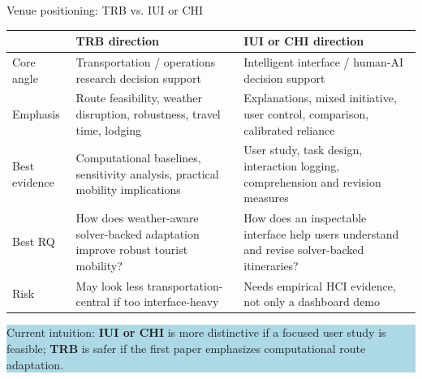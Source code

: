 \documentclass[aspectratio=169,10pt]{beamer}
\begin{document}
\begin{frame}{Venue positioning: TRB vs. IUI or CHI}
\renewcommand{\arraystretch}{1.22}
\scriptsize
\begin{tabular}{@{}>{\raggedright\arraybackslash}p{} >{\raggedright\arraybackslash}p{} >{\raggedright\arraybackslash}p{}@{}}
\toprule
 & \textbf{TRB direction} & \textbf{IUI or CHI direction} \\
\midrule
Core angle & Transportation / operations research decision support & Intelligent interface / human-AI decision support \\
Emphasis & Route feasibility, weather disruption, robustness, travel time, lodging & Explanations, mixed initiative, user control, comparison, calibrated reliance \\
Best evidence & Computational baselines, sensitivity analysis, practical mobility implications & User study, task design, interaction logging, comprehension and revision measures \\
Best RQ & How does weather-aware solver-backed adaptation improve robust tourist mobility? & How does an inspectable interface help users understand and revise solver-backed itineraries? \\
Risk & May look less transportation-central if too interface-heavy & Needs empirical HCI evidence, not only a dashboard demo \\
\bottomrule
\end{tabular}

\vspace{0.55em}
\centering
\colorbox{LightBlue}{\parbox{0.85\textwidth}{\centering\small Current intuition: \textbf{IUI or CHI} is more distinctive if a focused user study is feasible; \textbf{TRB} is safer if the first paper emphasizes computational route adaptation.}}
\end{frame}
\end{document}

